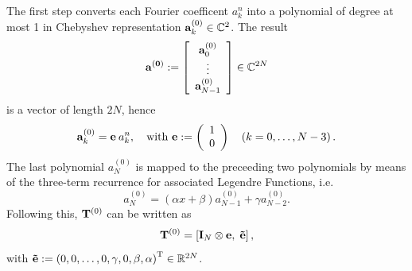 The first step converts each Fourier coefficent $a_{k}^n$ into a polynomial of degree at most 1 in Chebyshev representation $\mathbf{a}_{k}^{(0)} \in \mathbb{C}^2$. The result 
$$
  \mathbf{a^{(0)}} := 
    \left[\begin{array}{c}
      \mathbf{a}_{0}^{(0)}\\
      \vdots\\
      \mathbf{a}_{N-1}^{(0)}
    \end{array}\right] 
    \in \mathbb{C}^{2N}
$$ 
is a vector of length $2N$, hence 
$$ 
  \mathbf{a}_{k}^{(0)} = \mathbf{e} \: a_{k}^n,\quad \text{with } \mathbf{e} := \left(\begin{array}{l}1\\0\end{array}\right) \quad \left(k = 0,\ldots,N-3\right).
$$
The last polynomial $a_{N}^{(0)}$ is mapped to the preceeding two polynomials by means of the three-term recurrence for associated Legendre Functions, 
i.e. 
$$
  a_{N}^{(0)} = \left(\alpha x + \beta\right)a_{N-1}^{(0)} + \gamma a_{N-2}^{(0)}.
$$
Following this, $\mathbf{T}^{(0)}$ can be written as 
$$
  \mathbf{T}^{(0)} = \left[\mathbf{I}_{N} \otimes \mathbf{e},\;\mathbf{\tilde{e}}\right],
$$
with $\mathbf{\tilde{e}} := \left(0,0,\dots,0,\gamma, 0, \beta,\alpha\right)^{\text{\rm{T}}} \in \mathbb{R}^{2N}$.

